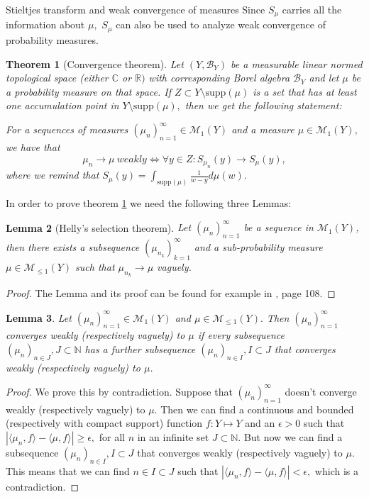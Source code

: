 \documentclass[11pt, a4paper, oneside]{book}
\numberwithin{equation}{chapter}
\newtheorem{thm}{Theorem}[section]
\newtheorem{lem}[thm]{Lemma}
\begin{document}
\begin{section}{Stieltjes transform and weak convergence of measures}
Since $S_\mu$ carries all the information about $\mu,$ $S_\mu$ can also be used to analyze weak convergence of probability measures.

\begin{thm}[Convergence theorem] \label{converge}
Let $(Y,\mathcal{B}_Y)$ be a measurable linear normed topological space (either $\mathbb{C}$ or $\mathbb{R})$ with corresponding Borel algebra $\mathcal{B}_Y$ and let $\mu$ be a probability measure on that space. If $Z \subset Y\setminus \mathrm{supp}(\mu)$ is a set that has at least one accumulation point in $Y\setminus \mathrm{supp}(\mu),$ then we get the following statement:

For a sequences of measures $( \mu_n )_{n=1}^\infty \in \mathcal{M}_1(Y)$ and a measure $\mu \in \mathcal{M}_1(Y),$ we have that
\[
\mu_n \to \mu \ \textit{weakly} \Leftrightarrow \forall y \in Z: S_{\mu_n}(y) \to S_\mu(y),
\]
where we remind that $S_\mu(y) = \int_{\mathrm{supp}(\mu)} \frac{1}{w-y}d\mu(w).$
\end{thm}

In order to prove theorem \ref{converge} we need the following three Lemmas:
\begin{lem}[Helly's selection theorem] \label{helly}
Let $(\mu_n)_{n=1}^\infty$ be a sequence in $\mathcal{M}_1(Y)$, then there exists a subsequence $(\mu_{n_k})_{k=1}^\infty$ and a sub-probability measure $\mu \in \mathcal{M}_{\leq 1}(Y)$ such that $\mu_{n_k} \to \mu$ vaguely.
\end{lem}

\begin{proof} 
The Lemma and its proof can be found for example in \cite{durrett2019probability}, page 108.
\end{proof}

\begin{lem} \label{subseq}
Let $(\mu_n)_{n=1}^\infty \in \mathcal{M}_1(Y)$ and $\mu \in \mathcal{M}_{\leq 1}(Y).$ Then $(\mu_n)_{n=1}^\infty$ converges weakly (respectively vaguely) to $\mu$ if every subsequence $(\mu_n)_{n \in J}, J \subset \mathbb{N}$ has a further subsequence $(\mu_n)_{n \in I}, I \subset J$ that converges weakly (respectively vaguely) to $\mu$.
\end{lem}

\begin{proof}
We prove this by contradiction. Suppose that $(\mu_n)_{n=1}^\infty$ doesn't converge weakly (respectively vaguely) to $\mu$. Then we can find a continuous and bounded (respectively with compact support) function $f: Y \mapsto Y$ and an $\epsilon > 0$ such that
$\left | \langle \mu_n , f \rangle -  \langle \mu , f \rangle \right | \geq \epsilon,$ for all $n$ in an infinite set $J \subset \mathbb{N}.$ But now we can find a subsequence $(\mu_n)_{n \in I}, I \subset J$ that converges weakly (respectively vaguely) to $\mu$. This means that we can find $n \in I \subset J$ such that $\left | \langle \mu_n , f \rangle -  \langle \mu , f \rangle \right | < \epsilon,$ which is a contradiction.
\end{proof}


\end{section}
\end{document}
